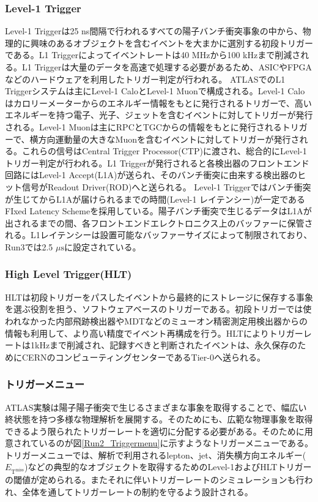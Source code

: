     \subsubsection{Level-1 Trigger}
    \baselineskip
    Level-1 Triggerは25 ns間隔で行われるすべての陽子バンチ衝突事象の中から、物理的に興味のあるオブジェクトを含むイベントを大まかに選別する初段トリガーである。L1 Triggerによってイベントレートは40 MHzから100 kHzまで削減される。L1 Triggerは大量のデータを高速で処理する必要があるため、ASICやFPGAなどのハードウェアを利用したトリガー判定が行われる。
    ATLASでのL1 Triggerシステムは主にLevel-1 CaloとLevel-1 Muonで構成される。Level-1 Caloはカロリーメーターからのエネルギー情報をもとに発行されるトリガーで、高いエネルギーを持つ電子、光子、ジェットを含むイベントに対してトリガーが発行される。Level-1 Muonは主にRPCとTGCからの情報をもとに発行されるトリガーで、横方向運動量の大きなMuonを含むイベントに対してトリガーが発行される。これらの信号はCentral Trigger Processor(CTP)に渡され、総合的にLevel-1トリガー判定が行われる。L1 Triggerが発行されると各検出器のフロントエンド回路にはLevel-1 Accept(L1A)が送られ、そのバンチ衝突に由来する検出器のヒット信号がReadout Driver(ROD)へと送られる。
    Level-1 Triggerではバンチ衝突が生じてからL1Aが届けられるまでの時間(Level-1 レイテンシー)が一定であるFIxed Latency Schemeを採用している。陽子バンチ衝突で生じるデータはL1Aが出されるまでの間、各フロントエンドエレクトロニクス上のバッファーに保管される。L1レイテンシーは設置可能なバッファーサイズによって制限されており、Run3では2.5 $\mu\mathrm{s}$に設定されている。

    \subsubsection*{High Level Trigger(HLT)}
    \baselineskip
    HLTは初段トリガーをパスしたイベントから最終的にストレージに保存する事象を選ぶ役割を担う、ソフトウェアベースのトリガーである。初段トリガーでは使われなかった内部飛跡検出器やMDTなどのミューオン精密測定用検出器からの情報も利用して、より高い精度でイベント再構成を行う。HLTによりトリガーレートは1kHzまで削減され、記録すべきと判断されたイベントは、永久保存のためにCERNのコンピューティングセンターであるTier-0へ送られる。

    \subsubsection*{トリガーメニュー}
    ATLAS実験は陽子陽子衝突で生じるさまざまな事象を取得することで、幅広い終状態を持つ多様な物理解析を展開する。そのためにも、広範な物理事象を取得できるよう限られたトリガーレートを適切に分配する必要がある。そのために用意されているのが図\ref{Run2_Triggermenu}に示すようなトリガーメニューである。トリガーメニューでは、解析で利用されるlepton、jet、消失横方向エネルギー($E_{\mathrm{T}^{\mathrm{miss}}}$)などの典型的なオブジェクトを取得するためのLevel-1およびHLTトリガーの閾値が定められる。またそれに伴いトリガーレートのシミュレーションも行われ、全体を通してトリガーレートの制約を守るよう設計される。

